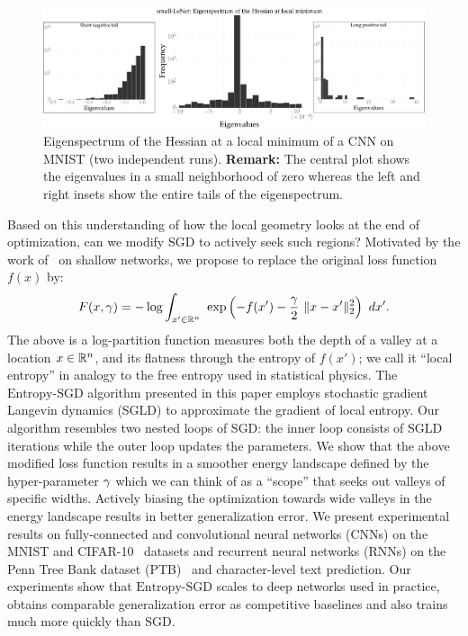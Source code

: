 \documentclass[10pt]{article}
\newcommand{\entropysgd}{\mathrm{Entropy}\textrm{-}\mathrm{SGD}}
\begin{document}
\begin{figure}[tbh]
\centering
\includegraphics[width=\textwidth]{lenet_hessian.pdf}
\caption{\small Eigenspectrum of the Hessian at a local minimum of a CNN on MNIST (two independent runs). \textbf{Remark:} The central plot shows the eigenvalues in a small neighborhood of zero whereas the left and right insets show the entire tails of the eigenspectrum.}
\label{fig:lenet_hessian}
\end{figure}

Based on this understanding of how the local geometry looks at the end of optimization, can we modify SGD to actively seek such regions? Motivated by the work of~\citet{baldassi2015subdominant} on shallow networks, we propose to replace the original loss function $f(x)$ by:
$$
F(x, \g) = - \log \int_{x' \in \reals^n}\ \exp \rbrac{-f(x') - \f{\g}{2}\ \norm{x-x'}^2_2}\ dx'.
$$
The above is a log-partition function measures both the depth of a valley at a location  $x \in \mathbb{R}^n$, and its flatness through the entropy of $f(x')$; we call it ``local entropy'' in analogy to the free entropy used in statistical physics. The $\entropysgd$ algorithm presented in this paper employs stochastic gradient Langevin dynamics (SGLD) to approximate the gradient of local entropy. Our algorithm resembles two nested loops of SGD: the inner loop consists of SGLD iterations while the outer loop updates the parameters. We show that the above modified loss function results in a smoother energy landscape defined by the hyper-parameter $\gamma$ which we can think of as a ``scope'' that seeks out valleys of specific widths. Actively biasing the optimization towards wide valleys in the energy landscape results in better generalization error. We present experimental results on fully-connected and convolutional neural networks (CNNs) on the MNIST and CIFAR-10~\citep{krizhevsky2009learning} datasets and recurrent neural networks (RNNs) on the Penn Tree Bank dataset (PTB)~\citep{marcus1993building} and character-level text prediction. Our experiments show that $\entropysgd$ scales to deep networks used in practice, obtains comparable generalization error as competitive baselines and also trains much more quickly than SGD.
\end{document}
